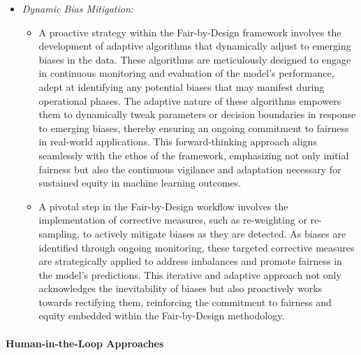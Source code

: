 \begin{itemize}
    
    \item \emph{Dynamic Bias Mitigation:}
    
    \begin{itemize}
    
        \item A proactive strategy within the Fair-by-Design framework involves the development of adaptive algorithms that dynamically adjust to emerging biases in the data. These algorithms are meticulously designed to engage in continuous monitoring and evaluation of the model's performance, adept at identifying any potential biases that may manifest during operational phases. The adaptive nature of these algorithms empowers them to dynamically tweak parameters or decision boundaries in response to emerging biases, thereby ensuring an ongoing commitment to fairness in real-world applications. This forward-thinking approach aligns seamlessly with the ethos of the framework, emphasizing not only initial fairness but also the continuous vigilance and adaptation necessary for sustained equity in machine learning outcomes.

        \item A pivotal step in the Fair-by-Design workflow involves the implementation of corrective measures, such as re-weighting or re-sampling, to actively mitigate biases as they are detected. As biases are identified through ongoing monitoring, these targeted corrective measures are strategically applied to address imbalances and promote fairness in the model's predictions. This iterative and adaptive approach not only acknowledges the inevitability of biases but also proactively works towards rectifying them, reinforcing the commitment to fairness and equity embedded within the Fair-by-Design methodology.

    \end{itemize}

\end{itemize}

\paragraph{Human-in-the-Loop Approaches}

